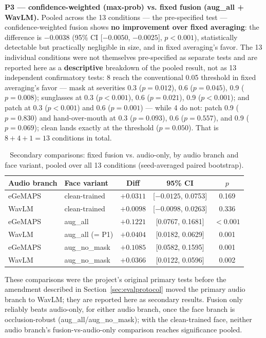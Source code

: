 \documentclass[10pt]{article}
\begin{document}
\textbf{P3 --- confidence-weighted (max-prob) vs. fixed fusion (aug\_all + WavLM).} Pooled across the 13
conditions --- the pre-specified test --- confidence-weighted fusion shows \textbf{no improvement over fixed
averaging}: the difference is $-0.0038$ (95\% CI [$-0.0050$, $-0.0025$], $p < 0.001$), statistically detectable
but practically negligible in size, and in fixed averaging's favor. The 13 individual conditions were
not themselves pre-specified as separate tests and are reported here as a \textbf{descriptive} breakdown of
the pooled result, not as 13 independent confirmatory tests: 8 reach the conventional 0.05 threshold in
fixed averaging's favor --- mask at severities 0.3 ($p=0.012$), 0.6 ($p=0.045$), 0.9 ($p=0.008$); sunglasses
at 0.3 ($p<0.001$), 0.6 ($p=0.021$), 0.9 ($p<0.001$); and patch at 0.3 ($p<0.001$) and 0.6 ($p=0.001$) ---
while 4 do not: patch 0.9 ($p=0.830$) and hand-over-mouth at 0.3 ($p=0.093$), 0.6 ($p=0.557$), and 0.9
($p=0.069$); clean lands exactly at the threshold ($p=0.050$). That is $8+4+1=13$ conditions in
total.

\begin{table}[h]
\small
\centering
\caption{Secondary comparisons: fixed fusion vs. audio-only, by audio branch and face variant, pooled
over all 13 conditions (seed-averaged paired bootstrap).}
\label{tab:secondary}
\begin{tabular}{llccc}
\toprule
Audio branch & Face variant & Diff & 95\% CI & $p$ \\
\midrule
eGeMAPS & clean-trained & $+0.0311$ & [$-0.0125$, 0.0753] & 0.169 \\
WavLM & clean-trained & $+0.0098$ & [$-0.0098$, 0.0263] & 0.336 \\
eGeMAPS & aug\_all & $+0.1221$ & [0.0767, 0.1681] & $<0.001$ \\
WavLM & aug\_all (= P1) & $+0.0404$ & [0.0182, 0.0629] & 0.001 \\
eGeMAPS & aug\_no\_mask & $+0.1085$ & [0.0582, 0.1595] & 0.001 \\
WavLM & aug\_no\_mask & $+0.0366$ & [0.0122, 0.0596] & 0.002 \\
\bottomrule
\end{tabular}
\end{table}

These comparisons were the project's original primary tests before the amendment described in Section~\ref{sec:evalprotocol}
moved the primary audio branch to WavLM; they are reported here as secondary results. Fusion only
reliably beats audio-only, for either audio branch, once the face branch is occlusion-robust
(aug\_all/aug\_no\_mask); with the clean-trained face, neither audio branch's fusion-vs-audio-only
comparison reaches significance pooled.
\end{document}
